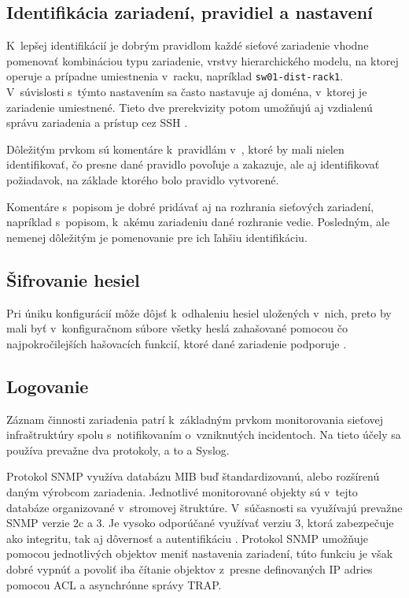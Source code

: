 \subsection{Identifikácia zariadení, pravidiel a nastavení}
K~lepšej identifikácií je dobrým pravidlom každé sieťové zariadenie vhodne pomenovať kombináciou typu zariadenie, vrstvy hierarchického modelu, na ktorej operuje a prípadne umiestnenia v~racku, napríklad \texttt{sw01-dist-rack1}. V~súvislosti s~týmto nastavením sa často nastavuje aj doména, v~ktorej je zariadenie umiestnené. Tieto dve prerekvizity potom umožňujú aj vzdialenú správu zariadenia a prístup cez SSH \cite{CIS_DrTLsgXv24lxeIIM}.

Dôležitým prvkom sú komentáre k~pravidlám v~, ktoré by mali nielen identifikovať, čo presne dané pravidlo povoľuje a zakazuje, ale aj identifikovať požiadavok, na základe ktorého bolo pravidlo vytvorené. 

Komentáre s~popisom je dobré pridávať aj na rozhrania sieťových zariadení, napríklad s~popisom, k~akému zariadeniu dané rozhranie vedie. Posledným, ale nemenej dôležitým je pomenovanie  pre ich ľahšiu identifikáciu.

\subsection{Šifrovanie hesiel}
Pri úniku konfigurácií môže dôjsť k~odhaleniu hesiel uložených v~nich, preto by mali byť v~konfiguračnom súbore všetky heslá zahašované pomocou čo najpokročilejších hašovacích funkcií, ktoré dané zariadenie podporuje \cite{CIS_DrTLsgXv24lxeIIM}.

\subsection{Logovanie}
Záznam činnosti zariadenia patrí k~základným prvkom monitorovania sieťovej infraštruktúry spolu s~notifikovaním o~vzniknutých incidentoch. Na tieto účely sa používa prevažne dva protokoly, a to  a Syslog. 

Protokol SNMP využíva databázu MIB buď štandardizovanú, alebo rozšírenú daným výrobcom zariadenia. Jednotlivé monitorované objekty sú v~tejto databáze organizované v~stromovej štruktúre. V~súčasnosti sa využívajú prevažne SNMP verzie 2c a 3. Je vysoko odporúčané využívať verziu 3, ktorá zabezpečuje ako integritu, tak aj dôvernosť a autentifikáciu \cite{CIS_DrTLsgXv24lxeIIM} \cite{Graesser2001}. Protokol SNMP umožňuje pomocou jednotlivých objektov meniť nastavenia zariadení, túto funkciu je však dobré vypnúť a povoliť iba čítanie objektov z~presne definovaných IP adries pomocou ACL a asynchrónne správy TRAP.   

